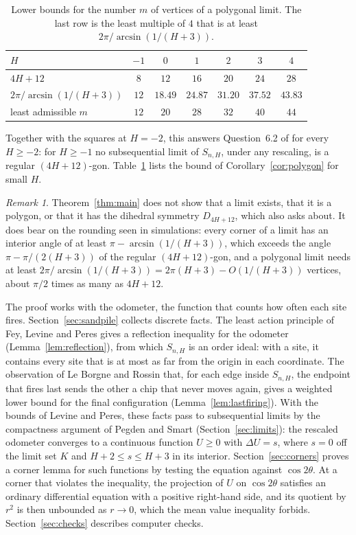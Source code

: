 \documentclass[11pt]{amsart}
\theoremstyle{remark}
\newtheorem{remark}[theorem]{Remark}
\numberwithin{equation}{section}
\begin{document}
\begin{table}[ht]
\centering
\begin{tabular}{lcccccc}
\toprule
$H$ & $-1$ & $0$ & $1$ & $2$ & $3$ & $4$\\
\midrule
$4H+12$ & $8$ & $12$ & $16$ & $20$ & $24$ & $28$\\
$2\pi/\arcsin(1/(H+3))$ & $12$ & $18.49$ & $24.87$ & $31.20$ & $37.52$ & $43.83$\\
least admissible $m$ & $12$ & $20$ & $28$ & $32$ & $40$ & $44$\\
\bottomrule
\end{tabular}
\caption{Lower bounds for the number $m$ of vertices of a polygonal limit. The last row is the least multiple of $4$ that is at least $2\pi/\arcsin(1/(H+3))$.}
\label{tab:vertices}
\end{table}

Together with the squares at $H=-2$, this answers Question~6.2 of \cite{HLMPPW} for every $H\ge-2$: for $H\ge-1$ no subsequential limit of $S_{n,H}$, under any rescaling, is a regular $(4H+12)$-gon. Table~\ref{tab:vertices} lists the bound of Corollary~\ref{cor:polygon} for small $H$.

\begin{remark}\label{rem:scope}
Theorem~\ref{thm:main} does not show that a limit exists, that it is a polygon, or that it has the dihedral symmetry $D_{4H+12}$, which \cite[Section~6]{HLMPPW} also asks about. It does bear on the rounding seen in simulations: every corner of a limit has an interior angle of at least $\pi-\arcsin(1/(H+3))$, which exceeds the angle $\pi-\pi/(2(H+3))$ of the regular $(4H+12)$-gon, and a polygonal limit needs at least $2\pi/\arcsin(1/(H+3))=2\pi(H+3)-O(1/(H+3))$ vertices, about $\pi/2$ times as many as $4H+12$.
\end{remark}

The proof works with the odometer, the function that counts how often each site fires. Section~\ref{sec:sandpile} collects discrete facts. The least action principle of Fey, Levine and Peres gives a reflection inequality for the odometer (Lemma~\ref{lem:reflection}), from which $S_{n,H}$ is an order ideal: with a site, it contains every site that is at most as far from the origin in each coordinate. The observation of Le Borgne and Rossin that, for each edge inside $S_{n,H}$, the endpoint that fires last sends the other a chip that never moves again, gives a weighted lower bound for the final configuration (Lemma~\ref{lem:lastfiring}). With the bounds of Levine and Peres, these facts pass to subsequential limits by the compactness argument of Pegden and Smart (Section~\ref{sec:limits}): the rescaled odometer converges to a continuous function $U\ge0$ with $\Delta U=s$, where $s=0$ off the limit set $K$ and $H+2\le s\le H+3$ in its interior. Section~\ref{sec:corners} proves a corner lemma for such functions by testing the equation against $\cos2\theta$. At a corner that violates the inequality, the projection of $U$ on $\cos2\theta$ satisfies an ordinary differential equation with a positive right-hand side, and its quotient by $r^2$ is then unbounded as $r\to0$, which the mean value inequality forbids. Section~\ref{sec:checks} describes computer checks.
\end{document}
